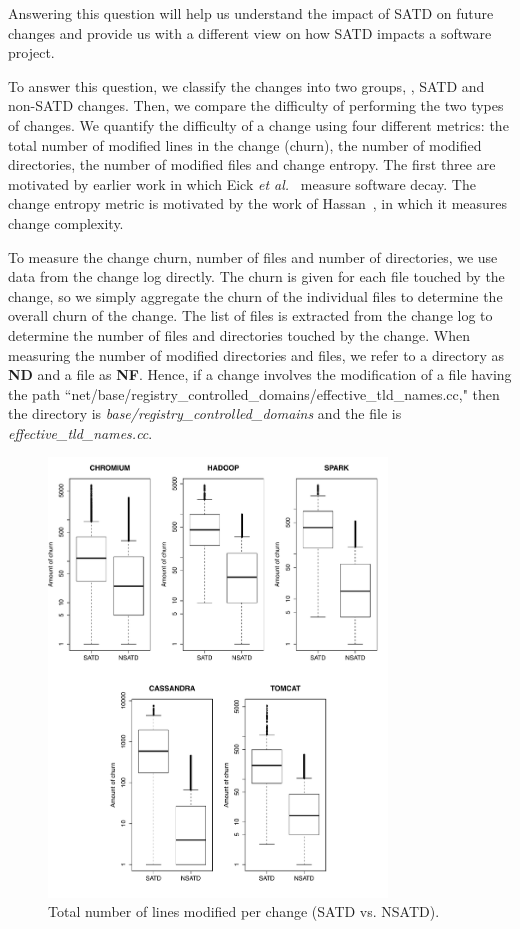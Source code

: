 Answering this question will help us understand the impact of SATD on future changes and provide us with a different view on how SATD impacts a software project.


  To answer this question, we classify the changes into two groups, \ie{}, SATD and non-SATD changes. Then, we compare the difficulty of performing the two types of changes. We quantify the difficulty of a change using four different metrics: the total number of modified lines in the change (churn), the number of modified directories, the number of modified files and change entropy. The first three are motivated by earlier work in which Eick \emph{et al.}~\cite{eick2001decay} measure software decay. The change entropy metric is motivated by the work of Hassan~\cite{hassan2009predicting}, in which it measures change complexity.



To measure the change churn, number of files and number of directories, we use data from the change log directly. The churn is given for each file touched by the change, so we simply aggregate the churn of the individual files to determine the overall churn of the change. The list of files is extracted from the change log to determine the number of files and directories touched by the change. When measuring the number of modified  directories and files, we refer to a directory as \textbf{ND} and  a file as \textbf{NF}. Hence, if a change involves the modification of a file having the path ``net/base/registry\_controlled\_domains/effective\_tld\_names.cc," then the directory is \textit{base/registry\_controlled\_domains} and the file is \textit{effective\_tld\_names.cc}.



\begin{figure}[h]
	\centering
	\includegraphics[width=90mm]{figures/chapter3/churn_for_all_projects}
	\caption{Total number of lines modified per change (SATD vs. NSATD).}
	\label{figure:tlcpc}
\end{figure}




